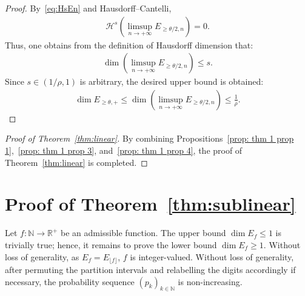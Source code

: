\documentclass[12pt,reqno]{amsart}
\theoremstyle{definition}
\theoremstyle{plain}
\begin{document}
\begin{proof}
By~\eqref{eq:HsEn} and Hausdorff--Cantelli, 
\begin{align*}
    \mathcal{H}^s\left(\limsup_{n\to+\infty}E_{\geq\theta/2,n}\right)=0.
\end{align*}
Thus, one obtains from the definition of Hausdorff dimension that:
\begin{align*}
    \dim\left(\limsup_{n\to+\infty}E_{\geq\theta/2,n}\right)\leq s.
\end{align*}
Since $s\in(1/\rho,1)$ is arbitrary, the desired upper bound is obtained:
\begin{align*}
    \dim{E_{\geq\theta,+}}\leq \dim\left(\limsup_{n\to+\infty}E_{\geq\theta/2,n}\right)\leq \frac{1}{\rho}.
\end{align*}
\end{proof}

\begin{proof}[Proof of Theorem~\ref{thm:linear}]
    By combining Propositions~\ref{prop: thm 1 prop 1},~\ref{prop: thm 1 prop 3}, and~\ref{prop: thm 1 prop 4}, the proof of Theorem~\ref{thm:linear} is completed.
\end{proof}

\section{Proof of Theorem~\ref{thm:sublinear}}

Let $f:\mathbb{N}\to\mathbb{R}^+$ be an admissible function. The upper bound $\dim{E_f}\leq 1$ is trivially true; hence, it remains to prove the lower bound $\dim{E_f}\geq 1$. Without loss of generality, as $E_f=E_{\lfloor f\rfloor}$, $f$ is integer-valued. Without loss of generality, after permuting the partition intervals and relabelling the digits accordingly if necessary, the probability sequence $(p_k)_{k\in\mathbb{N}}$ is non-increasing. 
\end{document}
